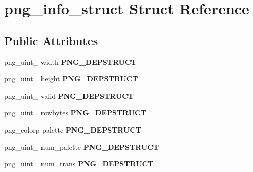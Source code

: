 \hypertarget{structpng__info__struct}{\section{png\-\_\-info\-\_\-struct Struct Reference}
\label{structpng__info__struct}
}
\subsection*{Public Attributes}
\begin{DoxyCompactItemize}
\item 
\hypertarget{structpng__info__struct_afd41442e38e3b7c16fb90c8ccb0e9932}{png\-\_\-uint\-\_ width {\bfseries P\-N\-G\-\_\-\-D\-E\-P\-S\-T\-R\-U\-C\-T}}\label{structpng__info__struct_afd41442e38e3b7c16fb90c8ccb0e9932}

\item 
\hypertarget{structpng__info__struct_a6bf677df6676b68ebafce3b19ffe08e6}{png\-\_\-uint\-\_ height {\bfseries P\-N\-G\-\_\-\-D\-E\-P\-S\-T\-R\-U\-C\-T}}\label{structpng__info__struct_a6bf677df6676b68ebafce3b19ffe08e6}

\item 
\hypertarget{structpng__info__struct_a14fc657ec4389632c88ed7e0280af81f}{png\-\_\-uint\-\_ valid {\bfseries P\-N\-G\-\_\-\-D\-E\-P\-S\-T\-R\-U\-C\-T}}\label{structpng__info__struct_a14fc657ec4389632c88ed7e0280af81f}

\item 
\hypertarget{structpng__info__struct_ab0ba09521cd4a67421a3e8002a78b87a}{png\-\_\-uint\-\_ rowbytes {\bfseries P\-N\-G\-\_\-\-D\-E\-P\-S\-T\-R\-U\-C\-T}}\label{structpng__info__struct_ab0ba09521cd4a67421a3e8002a78b87a}

\item 
\hypertarget{structpng__info__struct_a1eef1eefe7dd5232055338d41f5909d2}{png\-\_\-colorp palette {\bfseries P\-N\-G\-\_\-\-D\-E\-P\-S\-T\-R\-U\-C\-T}}\label{structpng__info__struct_a1eef1eefe7dd5232055338d41f5909d2}

\item 
\hypertarget{structpng__info__struct_a04f0345dc93ae461918f1897c11acbcc}{png\-\_\-uint\-\_ num\-\_\-palette {\bfseries P\-N\-G\-\_\-\-D\-E\-P\-S\-T\-R\-U\-C\-T}}\label{structpng__info__struct_a04f0345dc93ae461918f1897c11acbcc}

\item 
\hypertarget{structpng__info__struct_a71d3599762687b720012d9cd7055d663}{png\-\_\-uint\-\_ num\-\_\-trans {\bfseries P\-N\-G\-\_\-\-D\-E\-P\-S\-T\-R\-U\-C\-T}}\label{structpng__info__struct_a71d3599762687b720012d9cd7055d663}


\end{DoxyCompactItemize}
